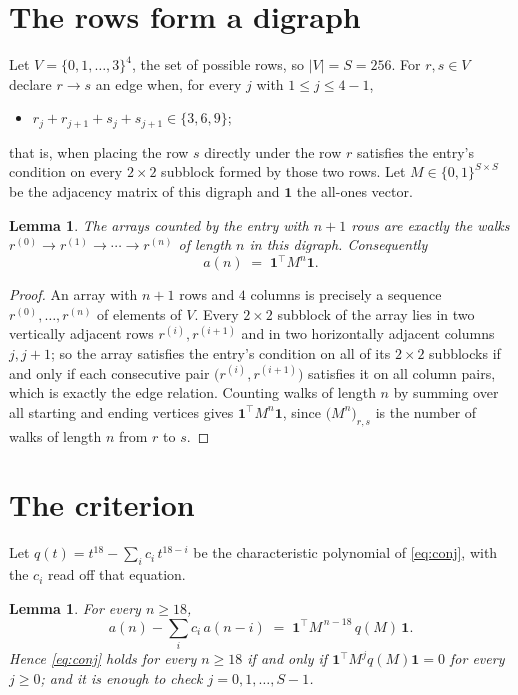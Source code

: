 \documentclass[11pt,a4paper]{article}
\theoremstyle{plain}
\newtheorem{lemma}[theorem]{Lemma}
\theoremstyle{definition}
\begin{document}
\section{The rows form a digraph}

Let $V=\{0,1,\dots,3\}^{4}$, the set of possible rows, so $|V|=S=256$. For
$r,s\in V$ declare $r\to s$ an edge when, for every $j$ with $1\le j\le 4-1$,
\begin{itemize}
\item $r_j+r_{j+1}+s_j+s_{j+1}\in\{3, 6, 9\}$;

\end{itemize}
that is, when placing the row $s$ directly under the row $r$ satisfies the entry's
condition on every $2\times2$ subblock formed by those two rows. Let $M\in\{0,1\}^{S\times
S}$ be the adjacency matrix of this digraph and $\mathbf{1}$ the all-ones vector.

\begin{lemma}\label{lem:walk}
The arrays counted by the entry with $n+1$ rows are exactly the walks
$r^{(0)}\to r^{(1)}\to\cdots\to r^{(n)}$ of length $n$ in this digraph. Consequently
\[
a(n)\;=\;\mathbf{1}^{\!\top}M^{n}\mathbf{1} .
\]
\end{lemma}

\begin{proof}
An array with $n+1$ rows and $4$ columns is precisely a sequence
$r^{(0)},\dots,r^{(n)}$ of elements of $V$. Every $2\times2$ subblock of the array lies
in two vertically adjacent rows $r^{(i)},r^{(i+1)}$ and in two horizontally adjacent
columns $j,j+1$; so the array satisfies the entry's condition on all of its $2\times2$
subblocks if and only if each consecutive pair $\bigl(r^{(i)},r^{(i+1)}\bigr)$ satisfies
it on all column pairs, which is exactly the edge relation. Counting walks of length $n$ by
summing over all starting and ending vertices gives
$\mathbf{1}^{\!\top}M^{n}\mathbf{1}$, since
$\bigl(M^{n}\bigr)_{r,s}$ is the number of walks of length $n$ from $r$ to $s$.
\end{proof}

\section{The criterion}

Let $q(t)=t^{18}-\sum_{i}c_i\,t^{18-i}$ be the characteristic polynomial of
\eqref{eq:conj}, with the $c_i$ read off that equation.

\begin{lemma}\label{lem:crit}
For every $n\ge18$,
\[
a(n)-\sum_i c_i\,a(n-i)\;=\;\mathbf{1}^{\!\top}M^{\,n-18}\,q(M)\,\mathbf{1} .
\]
Hence \eqref{eq:conj} holds for every $n\ge18$ if and only if
$\mathbf{1}^{\!\top}M^{j}q(M)\mathbf{1}=0$ for every $j\ge0$; and it is enough to
check $j=0,1,\dots,S-1$.
\end{lemma}
\end{document}
